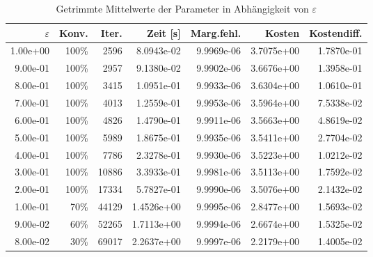 \begin{table}[htbp]
\caption{Getrimmte Mittelwerte der Parameter in Abhängigkeit von $\varepsilon$}
\label{tab:Parametertest256_tol1e-05}
\small
\centering
{}
\begin{tabular}{rrrrrrr}
\toprule
$\varepsilon$ & Konv. & Iter. & Zeit [s] & Marg.fehl. & Kosten & Kostendiff. \\
\midrule
1.00e+00 & 100\% & 2596 & 8.0943e-02 & 9.9969e-06 & 3.7075e+00 & 1.7870e-01 \\
9.00e-01 & 100\% & 2957 & 9.1380e-02 & 9.9902e-06 & 3.6676e+00 & 1.3958e-01 \\
8.00e-01 & 100\% & 3415 & 1.0951e-01 & 9.9933e-06 & 3.6304e+00 & 1.0610e-01 \\
7.00e-01 & 100\% & 4013 & 1.2559e-01 & 9.9953e-06 & 3.5964e+00 & 7.5338e-02 \\
6.00e-01 & 100\% & 4826 & 1.4790e-01 & 9.9911e-06 & 3.5663e+00 & 4.8619e-02 \\
5.00e-01 & 100\% & 5989 & 1.8675e-01 & 9.9935e-06 & 3.5411e+00 & 2.7704e-02 \\
4.00e-01 & 100\% & 7786 & 2.3278e-01 & 9.9930e-06 & 3.5223e+00 & 1.0212e-02 \\
3.00e-01 & 100\% & 10886 & 3.3933e-01 & 9.9981e-06 & 3.5113e+00 & 1.7592e-02 \\
2.00e-01 & 100\% & 17334 & 5.7827e-01 & 9.9990e-06 & 3.5076e+00 & 2.1432e-02 \\
1.00e-01 & 70\% & 44129 & 1.4526e+00 & 9.9995e-06 & 2.8477e+00 & 1.5693e-02 \\
9.00e-02 & 60\% & 52265 & 1.7113e+00 & 9.9994e-06 & 2.6674e+00 & 1.5325e-02 \\
8.00e-02 & 30\% & 69017 & 2.2637e+00 & 9.9997e-06 & 2.2179e+00 & 1.4005e-02 \\
\bottomrule
\end{tabular}
\end{table}
